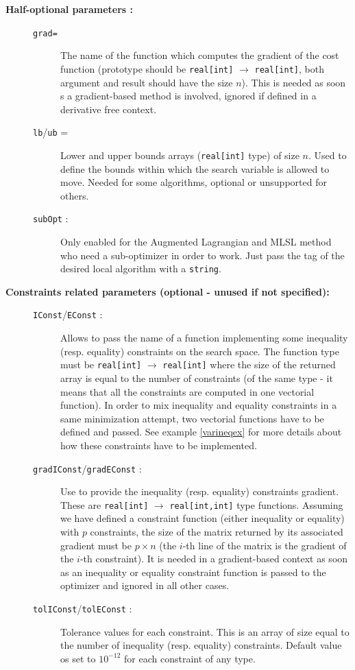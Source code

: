 \documentclass[a4paper,twoside,12pt]{book}
\begin{document}
\begin{description}

\item[\textbf{Half-optional parameters :}]
\begin{description}
    \item[ ]
    \item[\texttt{grad=}]  The name of the function which computes the gradient of the cost function (prototype should be {\tt real[int]} $\rightarrow$ {\tt real[int]}, both argument and result should have the size $n$). 
    This is needed as soon s a gradient-based method is involved, ignored if defined in a derivative free context. 
    \item[\texttt{lb}/\texttt{ub} =] Lower and upper bounds arrays ({\tt real[int]} type) of size $n$. Used to define the bounds within which the search variable is allowed to move. 
    Needed for some algorithms, optional or unsupported for others.
    \item[\texttt{subOpt} :] Only enabled for the Augmented Lagrangian and MLSL method who need a sub-optimizer in order to work. Just pass the tag of the desired local algorithm with a {\tt string}.
\end{description}

\item[\textbf{Constraints related parameters (optional - unused if not specified):}]
\begin{description}
  \item[ ]
  \item[\texttt{IConst}/\texttt{EConst} :] Allows to pass the name of a function implementing some inequality (resp. equality) constraints on the search space. The function type must be 
  {\tt real[int]} $\rightarrow$ {\tt real[int]} where the size of the returned array is equal to the number of constraints (of the same type - it means that all the constraints are computed in one vectorial function).
  In order to mix inequality and equality constraints in a same minimization attempt, two vectorial functions have to be defined and passed. See example \ref{varineqex} for more details about how these
  constraints have to be implemented.
  \item[\texttt{gradIConst}/\texttt{gradEConst} :] Use to provide the inequality (resp. equality) constraints gradient. These are {\tt real[int]} $\rightarrow$ {\tt real[int,int]} type functions. Assuming we have defined
  a constraint function (either inequality or equality) with $p$ constraints, the size of the matrix returned by its associated gradient must be $p\times n$ (the $i$-th line of the matrix is the gradient of the $i$-th
  constraint). It is needed in a gradient-based context as soon as an inequality or equality constraint function is passed to the optimizer and ignored in all other cases.
  \item[\texttt{tolIConst}/\texttt{tolEConst} :] Tolerance values for each constraint. This is an array of size equal to the number of inequality (resp. equality) constraints. Default value os set to $10^{-12}$
  for each constraint of any type.  
\end{description}


\end{description}
\end{document}

